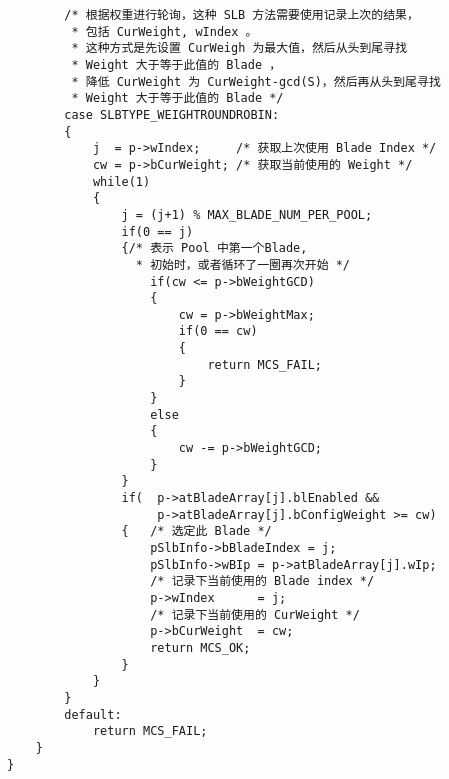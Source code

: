 ﻿\documentclass  [11pt,onecolumn]{article}
\begin{document}
\begin{lstlisting}
        /* 根据权重进行轮询，这种 SLB 方法需要使用记录上次的结果，
         * 包括 CurWeight, wIndex 。
         * 这种方式是先设置 CurWeigh 为最大值，然后从头到尾寻找
         * Weight 大于等于此值的 Blade ，
         * 降低 CurWeight 为 CurWeight-gcd(S)，然后再从头到尾寻找
         * Weight 大于等于此值的 Blade */
        case SLBTYPE_WEIGHTROUNDROBIN: 
        {
            j  = p->wIndex;     /* 获取上次使用 Blade Index */
            cw = p->bCurWeight; /* 获取当前使用的 Weight */
            while(1)
            {
                j = (j+1) % MAX_BLADE_NUM_PER_POOL;
                if(0 == j) 
                {/* 表示 Pool 中第一个Blade, 
                  * 初始时，或者循环了一圈再次开始 */
                    if(cw <= p->bWeightGCD)
                    {
                        cw = p->bWeightMax;
                        if(0 == cw)
                        {
                            return MCS_FAIL;
                        }
                    }
                    else
                    {
                        cw -= p->bWeightGCD;
                    }
                }
                if(  p->atBladeArray[j].blEnabled &&
                     p->atBladeArray[j].bConfigWeight >= cw)
                {   /* 选定此 Blade */
                    pSlbInfo->bBladeIndex = j;
                    pSlbInfo->wBIp = p->atBladeArray[j].wIp;
                    /* 记录下当前使用的 Blade index */
                    p->wIndex      = j;
                    /* 记录下当前使用的 CurWeight */
                    p->bCurWeight  = cw;
                    return MCS_OK;
                }
            } 
        }
        default:
            return MCS_FAIL;
    }
}
\end{lstlisting}

\pagebreak
\end{document}
